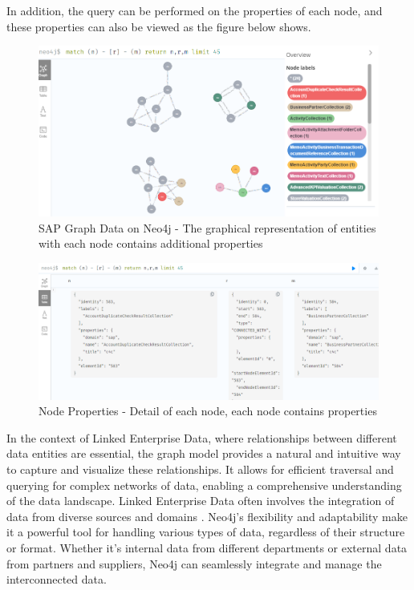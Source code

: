 \documentclass{article}
\begin{document}
In addition, the query can be performed on the properties of each node, and these properties can also be viewed as the figure below shows. 


\begin{figure}[ht!]
    \centering
    \includegraphics[scale=0.47]{neo4j-graph}
    \caption{SAP Graph Data on Neo4j - 
The graphical representation of entities with each node contains additional properties}
    \label{fig:neo4j-graph}
\end{figure}

\begin{figure}[ht!]
    \centering
    \includegraphics[scale=0.35]{neo4j-table}
    \caption{Node Properties - 
Detail of each node, each node contains properties}
    \label{fig:neo4j-table}
\end{figure}

In the context of Linked Enterprise Data, where relationships between different data entities are essential, the graph model provides a natural and intuitive way to capture and visualize these relationships. It allows for efficient traversal and querying for complex networks of data, enabling a comprehensive understanding of the data landscape. Linked Enterprise Data often involves the integration of data from diverse sources and domains \parencite{rao2017}. Neo4j’s flexibility and adaptability make it a powerful tool for handling various types of data, regardless of their structure or format. Whether it’s internal data from different departments or external data from partners and suppliers, Neo4j can seamlessly integrate and manage the interconnected data. 
\end{document}
